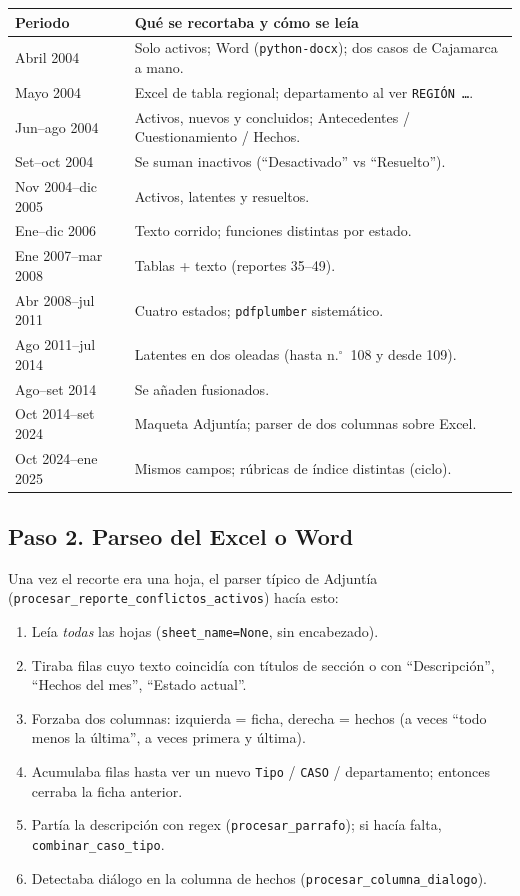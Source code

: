 \documentclass[11pt,a4paper]{article}
\begin{document}
\begin{center}
\renewcommand{\arraystretch}{1.15}
\begin{tabularx}{\textwidth}{@{}l Y@{}}
\toprule
\textbf{Periodo} & \textbf{Qué se recortaba y cómo se leía} \\
\midrule
Abril 2004 & Solo activos; Word (\texttt{python-docx}); dos casos de Cajamarca a mano. \\
Mayo 2004 & Excel de tabla regional; departamento al ver \texttt{REGIÓN \ldots}. \\
Jun--ago 2004 & Activos, nuevos y concluidos; Antecedentes / Cuestionamiento / Hechos. \\
Set--oct 2004 & Se suman inactivos (``Desactivado'' vs ``Resuelto''). \\
Nov 2004--dic 2005 & Activos, latentes y resueltos. \\
Ene--dic 2006 & Texto corrido; funciones distintas por estado. \\
Ene 2007--mar 2008 & Tablas + texto (reportes 35--49). \\
Abr 2008--jul 2011 & Cuatro estados; \texttt{pdfplumber} sistemático. \\
Ago 2011--jul 2014 & Latentes en dos oleadas (hasta n.$^\circ$~108 y desde 109). \\
Ago--set 2014 & Se añaden fusionados. \\
Oct 2014--set 2024 & Maqueta Adjuntía; parser de dos columnas sobre Excel. \\
Oct 2024--ene 2025 & Mismos campos; rúbricas de índice distintas (ciclo). \\
\bottomrule
\end{tabularx}
\end{center}

\subsection{Paso 2. Parseo del Excel o Word}

Una vez el recorte era una hoja, el parser típico de Adjuntía (\texttt{procesar\_reporte\_conflictos\_activos}) hacía esto:

\begin{enumerate}
  \item Leía \emph{todas} las hojas (\texttt{sheet\_name=None}, sin encabezado).
  \item Tiraba filas cuyo texto coincidía con títulos de sección o con ``Descripción'', ``Hechos del mes'', ``Estado actual''.
  \item Forzaba dos columnas: izquierda = ficha, derecha = hechos (a veces ``todo menos la última'', a veces primera y última).
  \item Acumulaba filas hasta ver un nuevo \texttt{Tipo} / \texttt{CASO} / departamento; entonces cerraba la ficha anterior.
  \item Partía la descripción con regex (\texttt{procesar\_parrafo}); si hacía falta, \texttt{combinar\_caso\_tipo}.
  \item Detectaba diálogo en la columna de hechos (\texttt{procesar\_columna\_dialogo}).
\end{enumerate}
\end{document}
